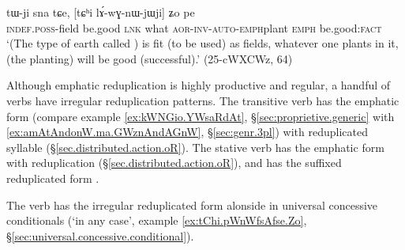  \begin{exe}
\ex \label{ex:tChi.lAwGnWjWji.Zo}
\gll tɯ-ji sna tɕe, [tɕʰi lɤ́-wɣ-nɯ-jɯ\redp{}ji] ʑo pe \\
\textsc{indef}.\textsc{poss}-field be.good \textsc{lnk} what \textsc{aor}-\textsc{inv}-\textsc{auto}-\textsc{emph}\redp{}plant \textsc{emph} be.good:\textsc{fact} \\
\glt `(The type of earth called ) is fit (to be used) as fields, whatever one plants in it, (the planting) will be good (successful).' (25-cWXCWz, 64)
\end{exe}


Although emphatic reduplication is highly productive and regular, a handful of verbs have irregular reduplication patterns. The transitive verb   has the emphatic form  (compare example \ref{ex:kWNGio.YWsaRdAt}, §\ref{sec:proprietive.generic} with \ref{ex:amAtAndonW.ma.GWznAndAGnW}, §\ref{sec:genr.3pl}) with  reduplicated syllable (§\ref{sec.distributed.action.oR}).  The stative verb  has the emphatic form  with  reduplication (§\ref{sec.distributed.action.oR}), and  has the suffixed  reduplicated form .

The verb  has the irregular reduplicated form  alonside  in universal concessive conditionals (`in any case', example \ref{ex:tChi.pWnWfsAfse.Zo}, §\ref{sec:universal.concessive.conditional}).
